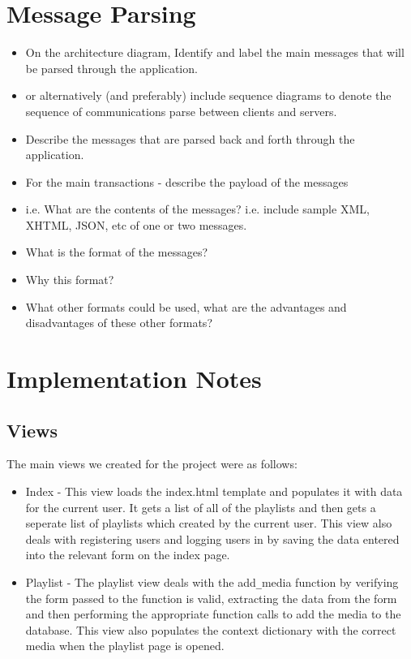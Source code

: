 \documentclass{sig-alt-release2}
\begin{document}
\section{Message Parsing}
\begin{itemize}

\item	On the architecture diagram, Identify and label the main messages that will be parsed through the application.
\item	or alternatively (and preferably) include sequence diagrams to denote the sequence of communications parse between clients and servers.
\item	Describe the messages that are parsed back and forth through the application.
\item	For the main transactions - describe the payload of the messages 
\item	i.e. What are the contents of the messages? i.e. include sample XML, XHTML, JSON, etc of one or two messages.
\item	What is the format of the messages? 
\item	Why this format? 
\item	What other formats could be used, what are the advantages and disadvantages of these other formats?
\end{itemize}


\section{Implementation Notes}

\subsection{Views}

The main views we created for the project were as follows:

\begin{itemize}
\item Index - This view loads the index.html template and populates it with data for the current user. It gets a list of all of the playlists and then gets a seperate list of playlists which created by the current user. This view also deals with registering users and logging users in by saving the data entered into the relevant form on the index page.
\item Playlist - The playlist view deals with the add\verb=_=media function by verifying the form passed to the function is valid, extracting the data from the form and then performing the appropriate function calls to add the media to the database. This view also populates the context dictionary with the correct media when the playlist page is opened.
\end{itemize}
\end{document}
